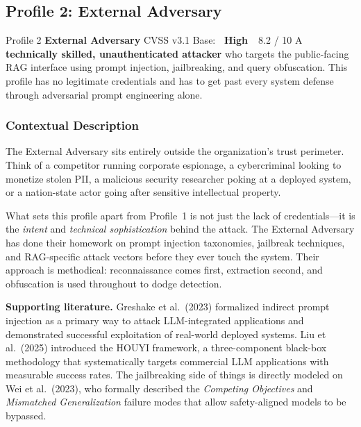 \documentclass[11pt,a4paper]{report}
\newcommand{\badgehigh}{\colorbox{warn}{\color{white}\small\textbf{~High~}}}
\begin{document}
\newpage
\subsection{Profile 2: External Adversary}

\begin{profilebanner}%
  {Profile 2 \enspace\textbf{External Adversary}}%
  {CVSS v3.1 Base: \badgehigh\ 8.2 / 10}
  \small
  A \textbf{technically skilled, unauthenticated attacker} who targets the
  public-facing RAG interface using prompt injection, jailbreaking, and query
  obfuscation. This profile has no legitimate credentials and has to get past
  every system defense through adversarial prompt engineering alone.
\end{profilebanner}

\subsubsection{Contextual Description}

\begin{prosebox}
The External Adversary sits entirely outside the organization's trust
perimeter. Think of a competitor running corporate espionage, a cybercriminal
looking to monetize stolen PII, a malicious security researcher poking at a
deployed system, or a nation-state actor going after sensitive intellectual
property.

What sets this profile apart from Profile~1 is not just the lack of
credentials---it is the \emph{intent} and \emph{technical sophistication}
behind the attack. The External Adversary has done their homework on prompt
injection taxonomies, jailbreak techniques, and RAG-specific attack vectors
before they ever touch the system. Their approach is methodical:
reconnaissance comes first, extraction second, and obfuscation is used
throughout to dodge detection.

\medskip
\textbf{Supporting literature.}
Greshake et al.\ (2023) formalized indirect prompt injection as a primary way
to attack LLM-integrated applications and demonstrated successful exploitation
of real-world deployed systems. Liu et al.\ (2025) introduced the HOUYI
framework, a three-component black-box methodology that systematically
targets commercial LLM applications with measurable success rates. The
jailbreaking side of things is directly modeled on Wei et al.\ (2023),
who formally described the \emph{Competing Objectives} and
\emph{Mismatched Generalization} failure modes that allow safety-aligned
models to be bypassed.
\end{prosebox}
\end{document}
